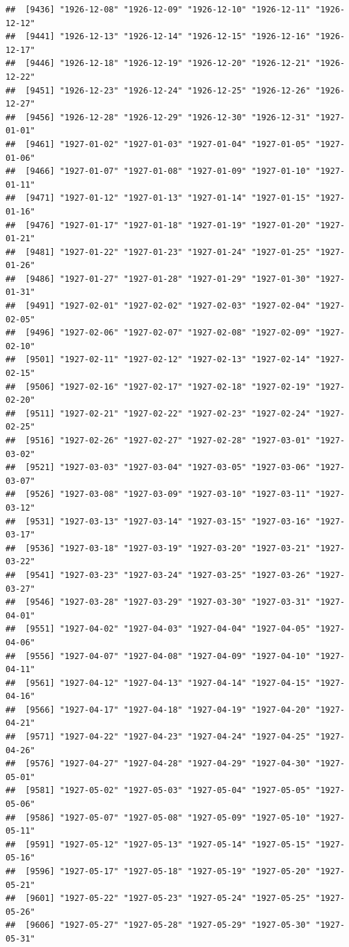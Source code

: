 \documentclass{article}\usepackage[]{graphicx}\usepackage[]{color}
\makeatletter
\newenvironment{kframe}{%
 \def\at@end@of@kframe{}%
 \ifinner\ifhmode%
  \def\at@end@of@kframe{\end{minipage}}%
  \begin{minipage}{\columnwidth}%
 \fi\fi%
 \def\FrameCommand##1{\hskip\@totalleftmargin \hskip-\fboxsep
 \colorbox{shadecolor}{##1}\hskip-\fboxsep
     \hskip-\linewidth \hskip-\@totalleftmargin \hskip\columnwidth}%
 \MakeFramed {\advance\hsize-\width
   \@totalleftmargin\z@ \linewidth\hsize
   \@setminipage}}%
 {\par\unskip\endMakeFramed%
 \at@end@of@kframe}
\newenvironment{knitrout}{}{} %
\makeatother
\begin{document}
\begin{description}
\begin{knitrout}
\begin{kframe}
\begin{verbatim}
##  [9436] "1926-12-08" "1926-12-09" "1926-12-10" "1926-12-11" "1926-12-12"
##  [9441] "1926-12-13" "1926-12-14" "1926-12-15" "1926-12-16" "1926-12-17"
##  [9446] "1926-12-18" "1926-12-19" "1926-12-20" "1926-12-21" "1926-12-22"
##  [9451] "1926-12-23" "1926-12-24" "1926-12-25" "1926-12-26" "1926-12-27"
##  [9456] "1926-12-28" "1926-12-29" "1926-12-30" "1926-12-31" "1927-01-01"
##  [9461] "1927-01-02" "1927-01-03" "1927-01-04" "1927-01-05" "1927-01-06"
##  [9466] "1927-01-07" "1927-01-08" "1927-01-09" "1927-01-10" "1927-01-11"
##  [9471] "1927-01-12" "1927-01-13" "1927-01-14" "1927-01-15" "1927-01-16"
##  [9476] "1927-01-17" "1927-01-18" "1927-01-19" "1927-01-20" "1927-01-21"
##  [9481] "1927-01-22" "1927-01-23" "1927-01-24" "1927-01-25" "1927-01-26"
##  [9486] "1927-01-27" "1927-01-28" "1927-01-29" "1927-01-30" "1927-01-31"
##  [9491] "1927-02-01" "1927-02-02" "1927-02-03" "1927-02-04" "1927-02-05"
##  [9496] "1927-02-06" "1927-02-07" "1927-02-08" "1927-02-09" "1927-02-10"
##  [9501] "1927-02-11" "1927-02-12" "1927-02-13" "1927-02-14" "1927-02-15"
##  [9506] "1927-02-16" "1927-02-17" "1927-02-18" "1927-02-19" "1927-02-20"
##  [9511] "1927-02-21" "1927-02-22" "1927-02-23" "1927-02-24" "1927-02-25"
##  [9516] "1927-02-26" "1927-02-27" "1927-02-28" "1927-03-01" "1927-03-02"
##  [9521] "1927-03-03" "1927-03-04" "1927-03-05" "1927-03-06" "1927-03-07"
##  [9526] "1927-03-08" "1927-03-09" "1927-03-10" "1927-03-11" "1927-03-12"
##  [9531] "1927-03-13" "1927-03-14" "1927-03-15" "1927-03-16" "1927-03-17"
##  [9536] "1927-03-18" "1927-03-19" "1927-03-20" "1927-03-21" "1927-03-22"
##  [9541] "1927-03-23" "1927-03-24" "1927-03-25" "1927-03-26" "1927-03-27"
##  [9546] "1927-03-28" "1927-03-29" "1927-03-30" "1927-03-31" "1927-04-01"
##  [9551] "1927-04-02" "1927-04-03" "1927-04-04" "1927-04-05" "1927-04-06"
##  [9556] "1927-04-07" "1927-04-08" "1927-04-09" "1927-04-10" "1927-04-11"
##  [9561] "1927-04-12" "1927-04-13" "1927-04-14" "1927-04-15" "1927-04-16"
##  [9566] "1927-04-17" "1927-04-18" "1927-04-19" "1927-04-20" "1927-04-21"
##  [9571] "1927-04-22" "1927-04-23" "1927-04-24" "1927-04-25" "1927-04-26"
##  [9576] "1927-04-27" "1927-04-28" "1927-04-29" "1927-04-30" "1927-05-01"
##  [9581] "1927-05-02" "1927-05-03" "1927-05-04" "1927-05-05" "1927-05-06"
##  [9586] "1927-05-07" "1927-05-08" "1927-05-09" "1927-05-10" "1927-05-11"
##  [9591] "1927-05-12" "1927-05-13" "1927-05-14" "1927-05-15" "1927-05-16"
##  [9596] "1927-05-17" "1927-05-18" "1927-05-19" "1927-05-20" "1927-05-21"
##  [9601] "1927-05-22" "1927-05-23" "1927-05-24" "1927-05-25" "1927-05-26"
##  [9606] "1927-05-27" "1927-05-28" "1927-05-29" "1927-05-30" "1927-05-31"

\end{verbatim}
\end{kframe}
\end{knitrout}
\end{description}
\end{document}
